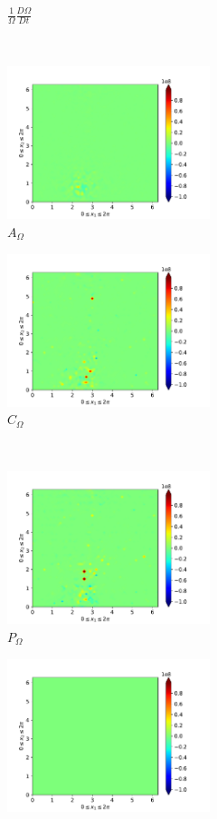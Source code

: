 \begin{figure}[H]
\begin{subfigure}[H]{0.45\textwidth}
        \caption{$\frac{1}{\Omega} \frac{D \Omega}{Dt}$}
    \end{subfigure}
    ~
    \begin{subfigure}{0.45\textwidth}
        \includegraphics[height=1.75in]{media/run-cds-65-5k/A-enst-4750.png}
        \caption{$A_{\Omega}$}
    \end{subfigure}
    \newline
    \begin{subfigure}{0.45\textwidth}
        \includegraphics[height=1.75in]{media/run-cds-65-5k/Pi-enst-4750.png}
        \caption{$C_{\Omega}$}
    \end{subfigure}
    ~
    \begin{subfigure}{0.45\textwidth}
        \includegraphics[height=1.75in]{media/run-cds-65-5k/P-enst-4750.png}
        \caption{$P_{\Omega}$}
    \end{subfigure}
    \newline
    \begin{subfigure}{0.45\textwidth}
        \includegraphics[height=1.75in]{media/run-cds-65-5k/B-enst-4750.png}

\end{subfigure}
\end{figure}

